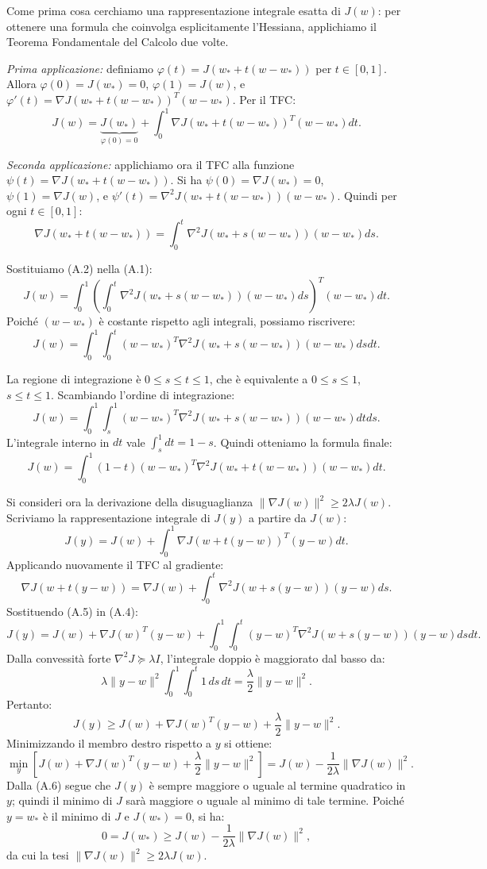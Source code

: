 \documentclass[a4paper,12pt]{article}
\numberwithin{equation}{section}
\numberwithin{figure}{section}
\numberwithin{table}{section}
\begin{document}
Come prima cosa cerchiamo una rappresentazione integrale esatta di $J(w)$: per ottenere una formula che coinvolga esplicitamente l'Hessiana, applichiamo il Teorema Fondamentale del Calcolo due volte.

\textit{Prima applicazione:} definiamo $\varphi(t) = J(w_* + t(w - w_*))$ per $t \in [0, 1]$. Allora $\varphi(0) = J(w_*) = 0$, $\varphi(1) = J(w)$, e $\varphi'(t) = \nabla J(w_* + t(w - w_*))^T (w - w_*)$. Per il TFC:
\[
J(w) = \underbrace{J(w_*)}_{\varphi(0)=0} + \int_0^1 \nabla J(w_* + t(w - w_*))^T (w - w_*) dt. \tag{A.1}
\]

\textit{Seconda applicazione:} applichiamo ora il TFC alla funzione $\psi(t) = \nabla J(w_* + t(w - w_*))$. Si ha $\psi(0) = \nabla J(w_*) = 0$, $\psi(1) = \nabla J(w)$, e $\psi'(t) = \nabla^2 J(w_* + t(w - w_*))(w - w_*)$. Quindi per ogni $t \in [0, 1]$:
\[
\nabla J(w_* + t(w - w_*)) = \int_0^t \nabla^2 J(w_* + s(w - w_*))(w - w_*) ds. \tag{A.2}
\]

Sostituiamo (A.2) nella (A.1):
\[
J(w) = \int_0^1 \left( \int_0^t \nabla^2 J(w_* + s(w - w_*))(w - w_*) ds \right)^T (w - w_*) dt.
\]
Poiché $(w - w_*)$ è costante rispetto agli integrali, possiamo riscrivere:
\[
J(w) = \int_0^1 \int_0^t (w - w_*)^T \nabla^2 J(w_* + s(w - w_*))(w - w_*) ds dt.
\]

La regione di integrazione è $0 \leq s \leq t \leq 1$, che è equivalente a $0 \leq s \leq 1$, $s \leq t \leq 1$. Scambiando l'ordine di integrazione:
\[
J(w) = \int_0^1 \int_s^1 (w - w_*)^T \nabla^2 J(w_* + s(w - w_*))(w - w_*) dt ds.
\]
L'integrale interno in $dt$ vale $\int_s^1 dt = 1 - s$. Quindi otteniamo la formula finale:
\[
J(w) = \int_0^1 (1 - t) (w - w_*)^T \nabla^2 J(w_* + t(w - w_*))(w - w_*) dt. \tag{A.3}
\]

Si consideri ora la derivazione della disuguaglianza $\|\nabla J(w)\|^2 \geq 2\lambda J(w)$. Scriviamo la rappresentazione integrale di $J(y)$ a partire da $J(w)$:
\[
J(y) = J(w) + \int_0^1 \nabla J(w + t(y - w))^T (y - w) dt. \tag{A.4}
\]
Applicando nuovamente il TFC al gradiente:
\[
\nabla J(w + t(y - w)) = \nabla J(w) + \int_0^t \nabla^2 J(w + s(y - w))(y - w) ds. \tag{A.5}
\]
Sostituendo (A.5) in (A.4):
\[
J(y) = J(w) + \nabla J(w)^T(y - w) + \int_0^1 \int_0^t (y - w)^T \nabla^2 J(w + s(y - w))(y - w) ds dt.
\]
Dalla convessità forte $\nabla^2 J \succeq \lambda I$, l'integrale doppio è maggiorato dal basso da:
\[
\lambda \|y - w\|^2 \int_0^1 \int_0^t 1 \, ds \, dt = \frac{\lambda}{2}\|y - w\|^2.
\]
Pertanto:
\[
J(y) \geq J(w) + \nabla J(w)^T(y - w) + \frac{\lambda}{2}\|y - w\|^2. \tag{A.6}
\]
Minimizzando il membro destro rispetto a $y$ si ottiene:
\[
\min_y \left[ J(w) + \nabla J(w)^T(y - w) + \frac{\lambda}{2}\|y - w\|^2 \right]
= J(w) - \frac{1}{2\lambda}\|\nabla J(w)\|^2.
\]
Dalla (A.6) segue che $J(y)$ è sempre maggiore o uguale al termine quadratico in $y$; quindi il minimo di $J$ sarà maggiore o uguale al minimo di tale termine. Poiché $y = w_*$ è il minimo di $J$ e $J(w_*) = 0$, si ha:
\[
0 = J(w_*) \geq J(w) - \frac{1}{2\lambda}\|\nabla J(w)\|^2,
\]
da cui la tesi $\|\nabla J(w)\|^2 \geq 2\lambda J(w)$.
\end{document}
